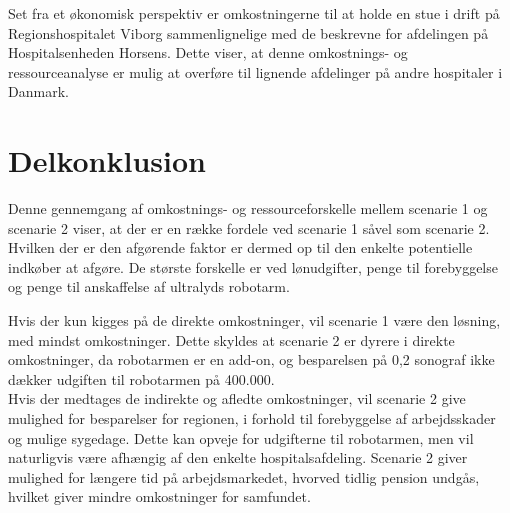Set fra et økonomisk perspektiv er omkostningerne til at holde en stue i drift på Regionshospitalet Viborg sammenlignelige med de beskrevne for afdelingen på Hospitalsenheden Horsens. Dette viser, at denne omkostnings- og ressourceanalyse er mulig at overføre til lignende afdelinger på andre hospitaler i Danmark. 

\section{Delkonklusion}
Denne gennemgang af omkostnings- og ressourceforskelle mellem scenarie 1 og scenarie 2 viser, at der er en række fordele ved scenarie 1 såvel som scenarie 2. Hvilken der er den afgørende faktor er dermed op til den enkelte potentielle indkøber at afgøre. De største forskelle er ved lønudgifter, penge til forebyggelse og penge til anskaffelse af ultralyds robotarm. 

Hvis der kun kigges på de direkte omkostninger, vil scenarie 1 være den løsning, med mindst omkostninger. Dette skyldes at scenarie 2 er dyrere i direkte omkostninger, da robotarmen er en add-on, og besparelsen på 0,2 sonograf ikke dækker udgiften til robotarmen på 400.000. \\
Hvis der medtages de indirekte og afledte omkostninger, vil scenarie 2 give mulighed for besparelser for regionen, i forhold til forebyggelse af arbejdsskader og mulige sygedage. Dette kan opveje for udgifterne til robotarmen, men vil naturligvis være afhængig af den enkelte hospitalsafdeling. Scenarie 2 giver mulighed for længere tid på arbejdsmarkedet, hvorved tidlig pension undgås, hvilket giver mindre omkostninger for samfundet.


